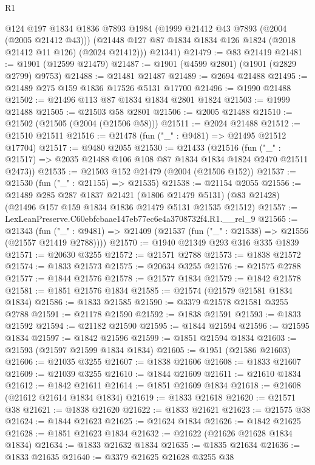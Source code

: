 \begin{lexlean}{R1}
\begin{coremodule}
        @124
        @197
        @1834
        @1836
        @7893
        @1984
        (@1999 @21412 @43 @7893 (@2004 (@2005 @21412 @43)))
        (@21448 @127 @87 @1834 @1834 @126 @1824 (@2018 @21412 @11 @126) (@2024 @21412)))
      @21341)
@21479 := @83 @21419
@21481 := @1901 (@12599 @21479)
@21487 := @1901 (@4599 @2801) (@1901 (@2829 @2799) @9753)
@21488 := @21481 @21487
@21489 := @2694 @21488
@21495 := @21489 @275 @159 @1836 @17526 @5131 @17700
@21496 := @1990 @21488
@21502 := @21496 @113 @87 @1834 @1834 @2801 @1824
@21503 := @1999 @21488
@21505 := @21503 @58 @2801
@21506 := @2005 @21488
@21510 := @21502 (@21505 (@2004 (@21506 @58)))
@21511 := @2024 @21488
@21512 := @21510 @21511
@21516 := @21478 (fun ("_" : @9481) => @21495 @21512 @17704)
@21517 := @9480 @2055
@21530 := @21433
    (@21516 (fun ("_" : @21517) => @2035 @21488 @106 @108 @87 @1834 @1834 @1824 @2470 @21511 @2473))
@21535 := @21503 @152 @21479 (@2004 (@21506 @152))
@21537 := @21530 (fun ("_" : @21155) => @21535)
@21538 := @21154 @2055
@21556 := @21489
    @285
    @287
    @1837
    @21421
    (@1806 @21479 @5131)
    (@83 @21428)
    (@21496 @157 @159 @1834 @1836 @21479 @5131 @21535 @21512)
@21557 := LexLeanPreserve.C60ebfcbaae147eb77ec6e4a3708732f4.R1.__rel_9
@21565 := @21343
    (fun ("_" : @9481) => @21409 (@21537 (fun ("_" : @21538) => @21556 (@21557 @21419 @2788))))
@21570 := @1940 @21349 @293 @316 @335 @1839
@21571 := @20630 @3255
@21572 := @21571 @2788
@21573 := @1838 @21572
@21574 := @1833 @21573
@21575 := @20634 @3255
@21576 := @21575 @2788
@21577 := @1844 @21576
@21578 := @21577 @1834
@21579 := @1842 @21578
@21581 := @1851 @21576 @1834
@21585 := @21574 (@21579 @21581 @1834 @1834)
@21586 := @1833 @21585
@21590 := @3379 @21578 @21581 @3255 @2788
@21591 := @21178 @21590
@21592 := @1838 @21591
@21593 := @1833 @21592
@21594 := @21182 @21590
@21595 := @1844 @21594
@21596 := @21595 @1834
@21597 := @1842 @21596
@21599 := @1851 @21594 @1834
@21603 := @21593 (@21597 @21599 @1834 @1834)
@21605 := @1951 (@21586 @21603)
@21606 := @21035 @3255
@21607 := @1838 @21606
@21608 := @1833 @21607
@21609 := @21039 @3255
@21610 := @1844 @21609
@21611 := @21610 @1834
@21612 := @1842 @21611
@21614 := @1851 @21609 @1834
@21618 := @21608 (@21612 @21614 @1834 @1834)
@21619 := @1833 @21618
@21620 := @21571 @38
@21621 := @1838 @21620
@21622 := @1833 @21621
@21623 := @21575 @38
@21624 := @1844 @21623
@21625 := @21624 @1834
@21626 := @1842 @21625
@21628 := @1851 @21623 @1834
@21632 := @21622 (@21626 @21628 @1834 @1834)
@21634 := @1833 @21632 @1834
@21635 := @1835 @21634
@21636 := @1833 @21635
@21640 := @3379 @21625 @21628 @3255 @38

\end{coremodule}
\end{lexlean}

